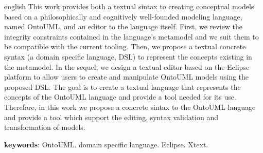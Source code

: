 \documentclass[
	10pt,				%
	oneside,
	a4paper,			%
	brazil,
	english
	]{abntex2}
\begin{document}
\begin{resumo}[Abstract]
 \begin{otherlanguage*}{english}
   This work provides both a textual sintax to creating conceptual models 
   based on a philosophically and cognitively well-founded modeling language,
   named OntoUML, and an editor to the language itself.
%
   First, we review the integrity constraints contained in the language's metamodel
   and we suit them to be compatible with the current tooling.
%
   Then, we propose a textual concrete syntax (a domain specific language, DSL)
   to represent the concepts existing in the metamodel.
%
   In the sequel, we design a textual editor based on the Eclipse platform
   to allow users to create and manipulate OntoUML models using the proposed DSL.
%
   The goal is to create a textual language that represents the concepts of
   the OntoUML language and provide a tool needed for its use.
%
   Therefore, in this work we propose a concrete sintax to the OntoUML language
   and provide a tool which support the editing, syntax validation and
   transformation of models.

   \textbf{keywords}: OntoUML. domain specific language. Eclipse. Xtext.
 \end{otherlanguage*}
\end{resumo}




\end{document}
